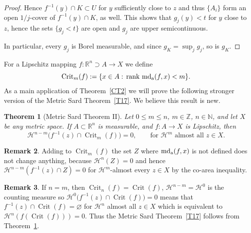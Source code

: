 \documentclass[12pt,leqno]{amsart}
\newtheorem{theorem}{Theorem}
\theoremstyle{definition}
\newtheorem{remark}[theorem]{Remark}
\newcommand{\bbbn}{\mathbb N}
\newcommand{\bbbz}{\mathbb Z}
\newcommand{\bbbr}{\mathbb R}
\def\H{{\mathcal H}}
\def\rank{{\rm rank\,}}
\def\apmd{\operatorname{md_{\rm a}}}
\numberwithin{theorem}{section} \numberwithin{equation}{section}
\begin{document}
\begin{proof}
Hence $f^{-1}(y)\cap K\subset U$ for $y$ sufficiently close to $z$ and thus $\{A_i\}$ form an open $1/j$-cover of $f^{-1}(y)\cap K$, as well. This shows that $g_j(y)<t$ for $y$ close to $z$, hence the sets $\{g_j<t\}$ are open and $g_j$ are upper semicontinuous.

In particular, every $g_j$ is Borel measurable, and since $g_K=\sup_j g_j$, so is $g_K$.
\end{proof}


For a Lipschitz mapping $f:\bbbr^n\supset A\to X$ we define
$$
\operatorname{Crit}_m(f):=\{x\in A:\, \rank \apmd(f,x)<m\}.
$$
As a main application of Theorem~\ref{CT2} we will prove the following stronger version of the Metric Sard Theorem~\ref{T17}. We believe this result is new.
\begin{theorem}[Metric Sard Theorem II]
\label{CT3}
Let $0\leq m\leq n$, $m\in\bbbz$, $n\in\bbbn$, and let $X$ be any metric space. If $A\subset\bbbr^n$ is measurable, and $f:A\to X$ is Lipschitz, then
$$
\H^{n-m}\big(f^{-1}(z)\cap\operatorname{Crit}_m(f)\big)=0,
\qquad
\text{for } \H^m \text{ almost all } z\in X.
$$
\end{theorem}
\begin{remark}
Adding to $\operatorname{Crit}_m(f)$ the set $Z$ where $\apmd(f,x)$ is not defined does not change anything, because $\H^n(Z)=0$ and hence $\H^{n-m}(f^{-1}(z)\cap Z)=0$ for $\H^m$-almost every $z\in X$ by the co-area inequality.
\end{remark}
\begin{remark}
If $n=m$, then $\operatorname{Crit}_n(f)=\operatorname{Crit}(f)$, $\H^{n-m}=\H^0$ is the counting measure so $\H^{0}\big(f^{-1}(z)\cap\operatorname{Crit}(f)\big)=0$ means that $f^{-1}(z)\cap\operatorname{Crit}(f)=\varnothing$ for $\H^n$ almost all $z\in X$ which is equivalent to $\H^n(f(\operatorname{Crit}(f)))=0$. Thus the Metric Sard Theorem~\ref{T17} follows from Theorem~\ref{CT3}.
\end{remark}
\end{document}

